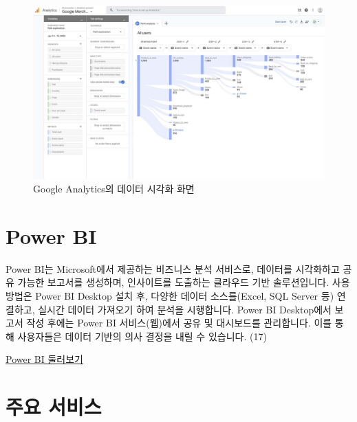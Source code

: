 \documentclass[
  letterpaper,
]{book}
\begin{document}
\begin{itemize}
  \begin{figure}[H]

  {\centering \includegraphics{img/fig17.png}

  }

  \caption{Google Analytics의 데이터 시각화 화면}

  \end{figure}%
\end{itemize}

\section{Power BI}\label{power-bi}

Power BI는 Microsoft에서 제공하는 비즈니스 분석 서비스로, 데이터를
시각화하고 공유 가능한 보고서를 생성하며, 인사이트를 도출하는 클라우드
기반 솔루션입니다. 사용 방법은 Power BI Desktop 설치 후, 다양한 데이터
소스를(Excel, SQL Server 등) 연결하고, 실시간 데이터 가져오기 하여
분석을 시행합니다. Power BI Desktop에서 보고서 작성 후에는 Power BI
서비스(웹)에서 공유 및 대시보드를 관리합니다. 이를 통해 사용자들은
데이터 기반의 의사 결정을 내릴 수 있습니다. (17)

\href{https://powerbi.microsoft.com/ko-kr/guidedtour/power-platform/power-bi/2/1}{Power
BI 둘러보기}

\section{주요 서비스}\label{uxc8fcuxc694-uxc11cuxbe44uxc2a4-1}
\end{document}
